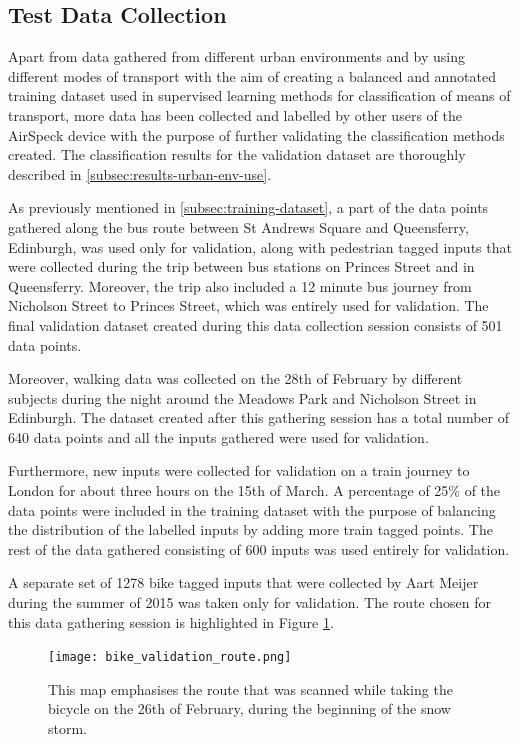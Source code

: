 \documentclass[bsc,frontabs,twoside,singlespacing,parskip,deptreport]{infthesis}     %
\begin{document}
\subsection{Test Data Collection}
\label{subsec:test-data-collection}

Apart from data gathered from different urban environments and by using different modes of transport with the aim of creating a balanced and annotated training dataset used in supervised learning methods for classification of means of transport, more data has been collected and labelled by other users of the AirSpeck device with the purpose of further validating the classification methods created. The classification results for the validation dataset are thoroughly described in \ref{subsec:results-urban-env-use}.

As previously mentioned in \ref{subsec:training-dataset}, a part of the data points gathered along the bus route between St Andrews Square and Queensferry, Edinburgh, was used only for validation, along with pedestrian tagged inputs that were collected during the trip between bus stations on Princes Street and in Queensferry. Moreover, the trip also included a 12 minute bus journey from Nicholson Street to Princes Street, which was entirely used for validation. The final validation dataset created during this data collection session consists of 501 data points.

Moreover, walking data was collected on the 28th of February by different subjects during the night around the Meadows Park and Nicholson Street in Edinburgh. The dataset created after this gathering session has a total number of 640 data points and all the inputs gathered were used for validation.

Furthermore, new inputs were collected for validation on a train journey to London for about three hours on the 15th of March. A percentage of 25\% of the data points were included in the training dataset with the purpose of balancing the distribution of the labelled inputs by adding more train tagged points. The rest of the data gathered consisting of 600 inputs was used entirely for validation.

A separate set of 1278 bike tagged inputs that were collected by Aart Meijer during the summer of 2015 was taken only for validation. The route chosen for this data gathering session is highlighted in Figure \ref{fig:bike-validation-route}.

\begin{figure}[h!]
  \center
  \texttt{[image: bike\_validation\_route.png]} 
  \caption{This map emphasises the route that was scanned while taking the bicycle on the 26th of February, during the beginning of the snow storm.}
  \label{fig:bike-validation-route}
\end{figure}
\end{document}
